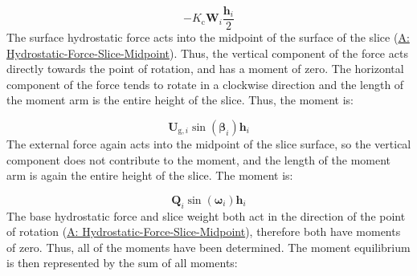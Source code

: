 \documentclass[12pt]{article}
\begin{document}
\begin{displaymath}
-{K_{\text{c}}} {\mathbf{W}}_{i} \frac{{\mathbf{h}}_{i}}{2}
\end{displaymath}
The surface hydrostatic force acts into the midpoint of the surface of the slice (\hyperref[assumpHFSM]{A: Hydrostatic-Force-Slice-Midpoint}). Thus, the vertical component of the force acts directly towards the point of rotation, and has a moment of zero. The horizontal component of the force tends to rotate in a clockwise direction and the length of the moment arm is the entire height of the slice. Thus, the moment is:

\begin{displaymath}
{\mathbf{U}_{\text{g},i}} \sin\left({\mathbf{β}}_{i}\right) {\mathbf{h}}_{i}
\end{displaymath}
The external force again acts into the midpoint of the slice surface, so the vertical component does not contribute to the moment, and the length of the moment arm is again the entire height of the slice. The moment is:

\begin{displaymath}
{\mathbf{Q}}_{i} \sin\left({\mathbf{ω}}_{i}\right) {\mathbf{h}}_{i}
\end{displaymath}
The base hydrostatic force and slice weight both act in the direction of the point of rotation (\hyperref[assumpHFSM]{A: Hydrostatic-Force-Slice-Midpoint}), therefore both have moments of zero. Thus, all of the moments have been determined. The moment equilibrium is then represented by the sum of all moments:
\end{document}
